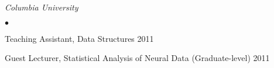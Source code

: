 \documentclass[margin,line]{res}
\newenvironment{list2}{
  \begin{list}{$\bullet$}{%
      \setlength{\itemsep}{0in}
      \setlength{\parsep}{0in} \setlength{\parskip}{0in}
      \setlength{\topsep}{0in} \setlength{\partopsep}{0in}
      \setlength{\leftmargin}{0.2in}}}{\end{list}}
\begin{document}
\begin{resume}
\emph{Columbia University}
\begin{list2}
\item Teaching Assistant, Data Structures \hfill 2011
\item Guest Lecturer, Statistical Analysis of Neural Data (Graduate-level) \hfill  2011
\end{list2}






\end{resume}
\end{document}
